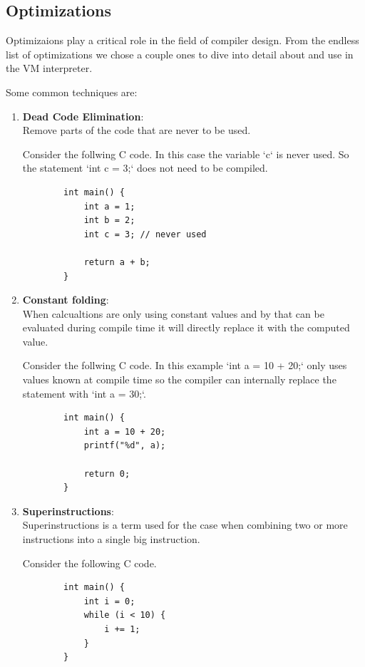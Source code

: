 \documentclass{article}
\begin{document}
\subsection{Optimizations}
Optimizaions play a critical role in the field of compiler design. From the
endless list of optimizations we chose a couple ones to dive into detail
about and use in the VM interpreter.

Some common techniques are:
\begin{enumerate}
    \item \textbf{Dead Code Elimination}:\\
    \label{item:dead_code_elimination}
        Remove parts of the code that are never to be used.

        Consider the follwing C code. In this case the variable `c` is never
        used. So the statement `int c = 3;` does not need to be compiled.
        \begin{verbatim}
        int main() {
            int a = 1;
            int b = 2;
            int c = 3; // never used

            return a + b;
        }
        \end{verbatim}
    \item \textbf{Constant folding}:\\
        When calcualtions are only using constant values and by that can be
        evaluated during compile time it will directly replace it with the
        computed value.

        Consider the follwing C code. In this example `int a = 10 + 20;` only uses values known
        at compile time so the compiler can internally replace the statement with `int a = 30;`.
        \begin{verbatim}
        int main() {
            int a = 10 + 20;
            printf("%d", a);

            return 0;
        }
        \end{verbatim}
    \item \textbf{Superinstructions}:\\
        Superinstructions is a term used for the case when combining two or more instructions 
        into a single big instruction.

        Consider the following C code.

        \begin{verbatim}
        int main() {
            int i = 0;
            while (i < 10) {
                i += 1;
            }
        }
        \end{verbatim}


\end{enumerate}
\end{document}
